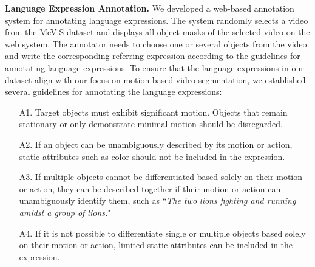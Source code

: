 \documentclass[10pt,twocolumn,letterpaper]{article}
\newcommand{\myparagraph}[1]{{\vspace{.5em} \noindent \bf #1}}
\newcommand{\ourdataset}{MeViS\xspace}
\begin{document}
\myparagraph{Language Expression Annotation.} 
We developed a web-based annotation system for annotating language expressions. The system randomly selects a video from the \ourdataset dataset and displays all object masks of the selected video on the web system. The annotator needs to choose one or several objects from the video and write the corresponding referring expression according to the guidelines for annotating language expressions. To ensure that the language expressions in our dataset align with our focus on motion-based video segmentation, we established several guidelines for annotating the language expressions:
\begin{itemize}
\setlength\itemsep{0em}
\item[A1.] Target objects must exhibit significant motion. Objects that remain stationary or only demonstrate minimal motion should be disregarded.
\vspace{-1mm}
\item[A2.] If an object can be unambiguously described by its motion or action, static attributes such as color should not be included in the expression.
\vspace{-1mm}
\item[A3.] If multiple objects cannot be differentiated based solely on their motion or action, they can be described together if their motion or action can unambiguously identify them, such as ``\textit{The two lions fighting and running amidst a group of lions.}"
\vspace{-1mm}
\item[A4.] If it is not possible to differentiate single or multiple objects based solely on their motion or action, limited static attributes can be included in the expression.
\end{itemize}
\end{document}
